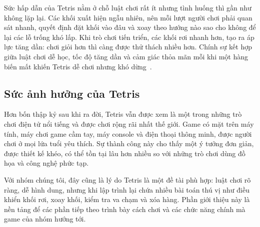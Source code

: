 Sức hấp dẫn của Tetris nằm ở chỗ luật chơi rất ít nhưng tình huống thì gần như không lặp lại. Các khối xuất hiện ngẫu nhiên, nên mỗi lượt người chơi phải quan sát nhanh, quyết định đặt khối vào đâu và xoay theo hướng nào sao cho không để lại các lỗ trống khó lấp. Khi trò chơi tiến triển, các khối rơi nhanh hơn, tạo ra áp lực tăng dần: chơi giỏi hơn thì càng được thử thách nhiều hơn. Chính sự kết hợp giữa luật chơi dễ học, tốc độ tăng dần và cảm giác thỏa mãn mỗi khi một hàng biến mất khiến Tetris dễ chơi nhưng khó dừng~\cite{filfre_tetris}.

\subsection{Sức ảnh hưởng của Tetris}

Hơn bốn thập kỷ sau khi ra đời, Tetris vẫn được xem là một trong những trò chơi điện tử nổi tiếng và được chơi rộng rãi nhất thế giới. Game có mặt trên máy tính, máy chơi game cầm tay, máy console và điện thoại thông minh, được người chơi ở mọi lứa tuổi yêu thích. Sự thành công này cho thấy một ý tưởng đơn giản, được thiết kế khéo, có thể tồn tại lâu hơn nhiều so với những trò chơi dùng đồ họa và công nghệ phức tạp.

Với nhóm chúng tôi, đây cũng là lý do Tetris là một đề tài phù hợp: luật chơi rõ ràng, dễ hình dung, nhưng khi lập trình lại chứa nhiều bài toán thú vị như điều khiển khối rơi, xoay khối, kiểm tra va chạm và xóa hàng. Phần giới thiệu này là nền tảng để các phần tiếp theo trình bày cách chơi và các chức năng chính mà game của nhóm hướng tới.
